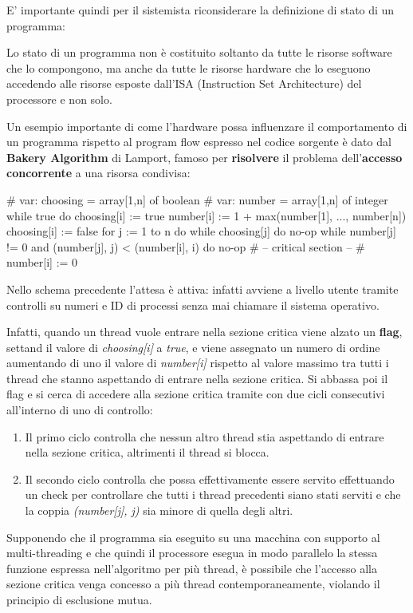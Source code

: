 E' importante quindi per il sistemista riconsiderare la definizione di stato di un programma:
\begin{definition}\label{def:program-state}
    Lo stato di un programma non è costituito soltanto da tutte le risorse software che lo compongono, ma anche da tutte le risorse hardware che lo eseguono accedendo alle risorse esposte dall'ISA (Instruction Set Architecture) del processore e non solo.
\end{definition}
Un esempio importante di come l'hardware possa influenzare il comportamento di un programma rispetto al program flow espresso nel codice sorgente è dato dal \textbf{Bakery Algorithm} di Lamport, famoso per \textbf{risolvere} il problema dell'\textbf{accesso concorrente} a una risorsa condivisa:
\begin{example}\label{ex:lamport-bakery}
\begin{code}[c]
    # var: choosing = array[1,n] of boolean
    # var: number = array[1,n] of integer
    while true do {
        choosing[i] := true
        number[i] := 1 + max(number[1], ..., number[n])
        choosing[i] := false
        for j := 1 to n do{
            while choosing[j] do no-op
            while number[j] != 0 and (number[j], j) < (number[i], i) do no-op
        }
        # -- critical section -- #
        number[i] := 0
    }
\end{code}
\end{example}\pagebreak
\begin{remark}
    Nello schema precedente l'attesa è attiva: infatti avviene a livello utente tramite controlli su numeri e ID di processi senza mai chiamare il sistema operativo.
\end{remark}
Infatti, quando un thread vuole entrare nella sezione critica viene alzato un \textbf{flag}, settand il valore di \textit{choosing[i]} a \textit{true}, e viene assegnato un numero di ordine aumentando di uno il valore di \textit{number[i]} rispetto al valore massimo tra tutti i thread che stanno aspettando di entrare nella sezione critica. Si abbassa poi il flag e si cerca di accedere alla sezione critica tramite con due cicli consecutivi all'interno di uno di controllo:
\begin{enumerate}
    \item Il primo ciclo controlla che nessun altro thread stia aspettando di entrare nella sezione critica, altrimenti il thread si blocca.
    \item Il secondo ciclo controlla che possa effettivamente essere servito effettuando un check per controllare che tutti i thread precedenti siano stati serviti e che la coppia \textit{(number[j], j)} sia minore di quella degli altri.
\end{enumerate}
Supponendo che il programma sia eseguito su una macchina con supporto al multi-threading e che quindi il processore esegua in modo parallelo la stessa funzione espressa nell'algoritmo per più thread, è possibile che l'accesso alla sezione critica venga concesso a più thread contemporaneamente, violando il principio di esclusione mutua.

